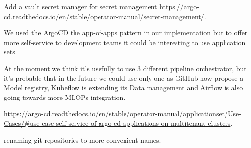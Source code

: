 Add a vault secret manager for secret management \url{https://argo-cd.readthedocs.io/en/stable/operator-manual/secret-management/}.

We used the ArgoCD the app-of-apps pattern in our implementation but to offer more self-service to development teams it could be interesting to use application sets

At the moment we think it's usefully to use 3 different pipeline orchestrator, but it's probable that in the future we could use only one as
GitHub now propose a Model registry, Kubeflow is extending its Data management and Airflow is also going towards more MLOPs integration.

\url{https://argo-cd.readthedocs.io/en/stable/operator-manual/applicationset/Use-Cases/#use-case-self-service-of-argo-cd-applications-on-multitenant-clusters}.

renaming git repositories to more convenient names.





